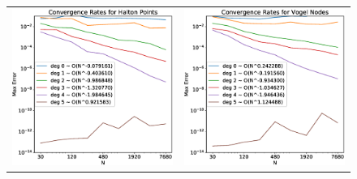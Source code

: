 \documentclass[12pt]{article}
\begin{document}
\begin{figure}[hp]
\begin{tabular}{cc}
			\includegraphics[width=\convFigSize\textwidth]{Convergence_halton.eps} & \includegraphics[width=\convFigSize\textwidth]{convergence_vogel.eps} \\

\end{tabular}
\end{figure}
\end{document}
